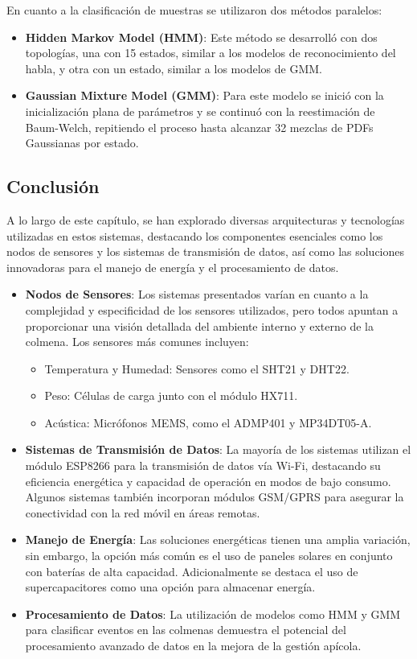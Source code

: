 En cuanto a la clasificación de muestras se utilizaron dos métodos paralelos:
\begin{itemize}
    \item \textbf{Hidden Markov Model (HMM)}: Este método se desarrolló con dos topologías, una con 15 estados, similar a los modelos de reconocimiento del habla, y otra con un estado, similar a los modelos de GMM.~\cite{zgank_2019}
    \item \textbf{Gaussian Mixture Model (GMM)}: Para este modelo se inició con la inicialización plana de parámetros y se continuó con la reestimación de Baum-Welch, repitiendo el proceso hasta alcanzar 32 mezclas de PDFs Gaussianas por estado.~\cite{zgank_2019}
\end{itemize}

\subsection{Conclusión}
A lo largo de este capítulo, se han explorado diversas arquitecturas y tecnologías utilizadas en estos sistemas, destacando los componentes esenciales como los nodos de sensores y los sistemas de transmisión de datos, así como las soluciones innovadoras para el manejo de energía y el procesamiento de datos.
\begin{itemize}
    \item \textbf{Nodos de Sensores}: Los sistemas presentados varían en cuanto a la complejidad y especificidad de los sensores utilizados, pero todos apuntan a proporcionar una visión detallada del ambiente interno y externo de la colmena. Los sensores más comunes incluyen:
          \begin{itemize}
              \item Temperatura y Humedad: Sensores como el SHT21 y DHT22.
              \item Peso: Células de carga junto con el módulo HX711.
              \item Acústica: Micrófonos MEMS, como el ADMP401 y MP34DT05-A.
          \end{itemize}
    \item \textbf{Sistemas de Transmisión de Datos}: La mayoría de los sistemas utilizan el módulo ESP8266 para la transmisión de datos vía Wi-Fi, destacando su eficiencia energética y capacidad de operación en modos de bajo consumo. Algunos sistemas también incorporan módulos GSM/GPRS para asegurar la conectividad con la red móvil en áreas remotas.
    \item \textbf{Manejo de Energía}: Las soluciones energéticas tienen una amplia variación, sin embargo, la opción más común es el uso de paneles solares en conjunto con baterías de alta capacidad. Adicionalmente se destaca el uso de supercapacitores como una opción para almacenar energía.
    \item \textbf{Procesamiento de Datos}: La utilización de modelos como HMM y GMM para clasificar eventos en las colmenas demuestra el potencial del procesamiento avanzado de datos en la mejora de la gestión apícola.
\end{itemize}
